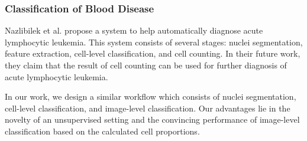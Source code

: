 \documentclass[journal]{IEEEtran}
\begin{document}

\subsubsection{Classification of Blood Disease}



Nazlibilek et al. \cite{Nazlibilek2014Automatic} propose a system to help automatically diagnose acute lymphocytic leukemia. This system consists of several stages: nuclei segmentation, feature extraction, cell-level classification, and cell counting. In their future work, they claim that the result of cell counting can be used for further diagnosis of acute lymphocytic leukemia.

In our work, we design a similar workflow which consists of nuclei segmentation, cell-level classification, and image-level classification. Our advantages lie in the novelty of an unsupervised setting and the convincing performance of image-level classification based on the calculated cell proportions.
\end{document}
